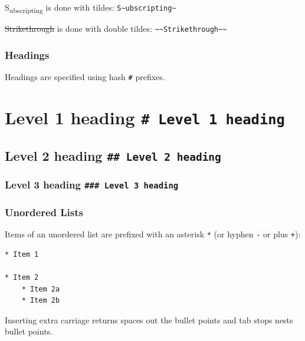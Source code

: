 \documentclass[]{article}
\begin{document}
S\textsubscript{ubscripting} is done with tildes:
\texttt{S\textasciitilde{}ubscripting\textasciitilde{}}

\sout{Strikethrough} is done with double tildes:
\texttt{\textasciitilde{}\textasciitilde{}Strikethrough\textasciitilde{}\textasciitilde{}}

\hypertarget{headings}{%
\subsubsection{Headings}\label{headings}}

Headings are specified using hash \texttt{\#} prefixes.

\hypertarget{level-1-heading-level-1-heading}{%
\section{\texorpdfstring{Level 1 heading
\texttt{\#\ Level\ 1\ heading}}{Level 1 heading \# Level 1 heading}}\label{level-1-heading-level-1-heading}}

\hypertarget{level-2-heading-level-2-heading}{%
\subsection{\texorpdfstring{Level 2 heading
\texttt{\#\#\ Level\ 2\ heading}}{Level 2 heading \#\# Level 2 heading}}\label{level-2-heading-level-2-heading}}

\hypertarget{level-3-heading-level-3-heading}{%
\subsubsection{\texorpdfstring{Level 3 heading
\texttt{\#\#\#\ Level\ 3\ heading}}{Level 3 heading \#\#\# Level 3 heading}}\label{level-3-heading-level-3-heading}}

\hypertarget{unordered-lists}{%
\subsubsection{Unordered Lists}\label{unordered-lists}}

Items of an unordered list are prefixed with an asterisk \texttt{*} (or
hyphen \texttt{-} or plus \texttt{+}):

\begin{verbatim}
* Item 1

* Item 2
    * Item 2a
    * Item 2b
\end{verbatim}

Inserting extra carriage returns spaces out the bullet points and tab
stops nests bullet points.
\end{document}
